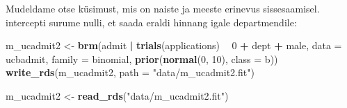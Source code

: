 \documentclass[]{book}
\newenvironment{Shaded}{\begin{snugshade}}{\end{snugshade}}
\newcommand{\KeywordTok}[1]{\textcolor[rgb]{0.13,0.29,0.53}{\textbf{#1}}}
\newcommand{\DataTypeTok}[1]{\textcolor[rgb]{0.13,0.29,0.53}{#1}}
\newcommand{\DecValTok}[1]{\textcolor[rgb]{0.00,0.00,0.81}{#1}}
\newcommand{\StringTok}[1]{\textcolor[rgb]{0.31,0.60,0.02}{#1}}
\newcommand{\CommentTok}[1]{\textcolor[rgb]{0.56,0.35,0.01}{\textit{#1}}}
\newcommand{\OperatorTok}[1]{\textcolor[rgb]{0.81,0.36,0.00}{\textbf{#1}}}
\newcommand{\NormalTok}[1]{#1}
\begin{document}
\begin{Shaded}
\end{Shaded}

Mudeldame otse küsimust, mis on naiste ja meeste erinevus sissesaamisel.
intercepti surume nulli, et saada eraldi hinnang igale departmendile:

\begin{Shaded}
\begin{Highlighting}[]
\NormalTok{m_ucadmit2 <-}\StringTok{ }\KeywordTok{brm}\NormalTok{(admit }\OperatorTok{|}\StringTok{ }\KeywordTok{trials}\NormalTok{(applications) }\OperatorTok{~}\StringTok{ }\DecValTok{0} \OperatorTok{+}\StringTok{ }\NormalTok{dept }\OperatorTok{+}\StringTok{ }\NormalTok{male,}
                  \DataTypeTok{data =}\NormalTok{ ucbadmit, }
                  \DataTypeTok{family =}\NormalTok{ binomial,}
                  \KeywordTok{prior}\NormalTok{(}\KeywordTok{normal}\NormalTok{(}\DecValTok{0}\NormalTok{, }\DecValTok{10}\NormalTok{), }\DataTypeTok{class =}\NormalTok{ b))}
\KeywordTok{write_rds}\NormalTok{(m_ucadmit2, }\DataTypeTok{path =} \StringTok{"data/m_ucadmit2.fit"}\NormalTok{)}
\end{Highlighting}
\end{Shaded}

\begin{Shaded}
\begin{Highlighting}[]
\NormalTok{m_ucadmit2 <-}\StringTok{ }\KeywordTok{read_rds}\NormalTok{(}\StringTok{"data/m_ucadmit2.fit"}\NormalTok{)}
\end{Highlighting}
\end{Shaded}
\end{document}
